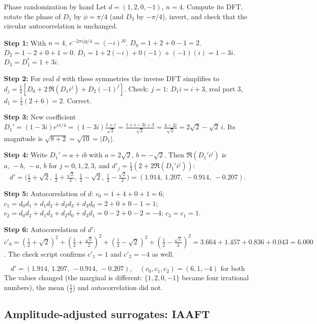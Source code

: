 \begin{sample}{Phase randomization by hand}
Let $d=(1,2,0,-1)$, $n=4$. Compute its DFT, rotate the phase of $D_1$ by $\phi=\pi/4$ (and $D_3$ by $-\pi/4$), invert, and check that the circular autocorrelation is unchanged.

\textbf{Step 1:} With $n=4$, $e^{-2\pi ijq/4}=(-i)^{jq}$. $D_0=1+2+0-1=2$. $D_2=1-2+0+1=0$. $D_1=1+2(-i)+0(-1)+(-1)(i)=1-3i$. $D_3=D_1^*=1+3i$.

\textbf{Step 2:} For real $d$ with these symmetries the inverse DFT simplifies to $d_j=\frac14[D_0+2\,\Re(D_1i^j)+D_2(-1)^j]$. Check: $j=1$: $D_1i=i+3$, real part $3$, $d_1=\frac14(2+6)=2$. Correct.

\textbf{Step 3:} New coefficient $D_1'=(1-3i)e^{i\pi/4}=(1-3i)\frac{1+i}{\sqrt2}=\frac{1+i-3i+3}{\sqrt2}=\frac{4-2i}{\sqrt2}=2\sqrt2-\sqrt2\,i$. Its magnitude is $\sqrt{8+2}=\sqrt{10}=|D_1|$.

\textbf{Step 4:} Write $D_1'=a+ib$ with $a=2\sqrt2$, $b=-\sqrt2$. Then $\Re(D_1'i^j)$ is $a,\,-b,\,-a,\,b$ for $j=0,1,2,3$, and $d'_j=\frac14(2+2\Re(D_1'i^j))$:
\[
d'=\big(\tfrac12+\sqrt2,\ \tfrac12+\tfrac{\sqrt2}2,\ \tfrac12-\sqrt2,\ \tfrac12-\tfrac{\sqrt2}2\big)=(1.914,\ 1.207,\ -0.914,\ -0.207).
\]

\textbf{Step 5:} Autocorrelation of $d$: $c_0=1+4+0+1=6$; $c_1=d_0d_1+d_1d_2+d_2d_3+d_3d_0=2+0+0-1=1$; $c_2=d_0d_2+d_1d_3+d_2d_0+d_3d_1=0-2+0-2=-4$; $c_3=c_1=1$.

\textbf{Step 6:} Autocorrelation of $d'$: $c'_0=(\tfrac12+\sqrt2)^2+(\tfrac12+\tfrac{\sqrt2}2)^2+(\tfrac12-\sqrt2)^2+(\tfrac12-\tfrac{\sqrt2}2)^2=3.664+1.457+0.836+0.043=6.000$. The check script confirms $c'_1=1$ and $c'_2=-4$ as well.

\[
\boxed{d'=(1.914,\,1.207,\,-0.914,\,-0.207),\quad (c_0,c_1,c_2)=(6,1,-4)\text{ for both}}
\]
The values changed (the marginal is different: $\{1,2,0,-1\}$ became four irrational numbers), the mean ($\tfrac12$) and autocorrelation did not.
\end{sample}

\subsection{Amplitude-adjusted surrogates: IAAFT}

